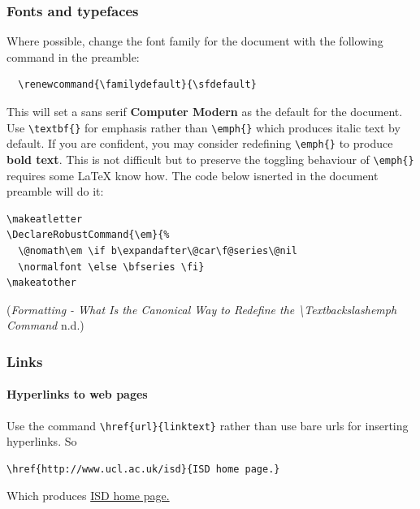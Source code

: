 \documentclass[]{article}
\makeatletter
\renewcommand{\familydefault}{\sfdefault}
\DeclareRobustCommand{\em}{%
  \@nomath\em \if b\expandafter\@car\f@series\@nil
  \normalfont \else \bfseries \fi}
\makeatother
\begin{document}
\hypertarget{fonts-and-typefaces}{%
\subsubsection{Fonts and typefaces}\label{fonts-and-typefaces}}

Where possible, change the font family for the document with the
following command in the preamble:

\begin{verbatim}
  \renewcommand{\familydefault}{\sfdefault}
\end{verbatim}

This will set a sans serif \textbf{Computer Modern} as the default for
the document. Use \texttt{\textbackslash{}textbf\{\}} for emphasis
rather than \texttt{\textbackslash{}emph\{\}} which produces italic text
by default. If you are confident, you may consider redefining
\texttt{\textbackslash{}emph\{\}} to produce \textbf{bold text}. This is
not difficult but to preserve the toggling behaviour of
\texttt{\textbackslash{}emph\{\}} requires some LaTeX know how. The code
below isnerted in the document preamble will do it:

\begin{verbatim}
\makeatletter
\DeclareRobustCommand{\em}{%
  \@nomath\em \if b\expandafter\@car\f@series\@nil
  \normalfont \else \bfseries \fi}
\makeatother
\end{verbatim}

(\emph{Formatting - What Is the Canonical Way to Redefine the
\textbackslash{}Textbackslashemph Command} n.d.)

\hypertarget{links}{%
\subsubsection{Links}\label{links}}

\hypertarget{hyperlinks-to-web-pages}{%
\paragraph{Hyperlinks to web pages}\label{hyperlinks-to-web-pages}}

Use the command \texttt{\textbackslash{}href\{url\}\{linktext\}} rather
than use bare urls for inserting hyperlinks. So

\begin{verbatim}
\href{http://www.ucl.ac.uk/isd}{ISD home page.}
\end{verbatim}

Which produces \href{http://www.ucl.ac.uk/isd}{ISD home page.}
\end{document}
